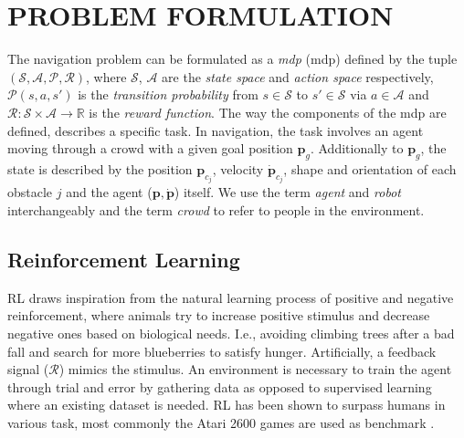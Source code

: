 \documentclass[letterpaper,conference,10pt]{IEEEconf}
\begin{document}
\section{PROBLEM FORMULATION}\label{sec:problem}

The navigation problem can be formulated as a \textit{\acrlong*{mdp}} (\acrshort*{mdp}) defined by the tuple $(\mathcal{S,A,P,R})$, where $\mathcal{S}$, $\mathcal{A}$ are the \textit{state space} and \textit{action space} respectively, $\mathcal{P}(s,a,s')$ is the \textit{transition probability} from $s\in\mathcal{S}$ to $s'\in\mathcal{S}$ via $a\in\mathcal{A}$ and $\mathcal{R}:\mathcal{S}\times\mathcal{A}\rightarrow \mathbb{R}$ is the \textit{reward function}. The way the components of the \acrshort*{mdp} are defined, describes a specific task. In navigation, the task involves an agent moving through a crowd with a given goal position $\boldsymbol{p}_g$. Additionally to $\boldsymbol{p}_g$, the state is described by the position $\boldsymbol{p}_{c_j}$, velocity $\dot{\boldsymbol{p}}_{c_j}$, shape and orientation of each obstacle $j$ and the agent ($\boldsymbol{p}, \dot{\boldsymbol{p}}$) itself. We use the term \textit{agent} and \textit{robot} interchangeably and the term \textit{crowd} to refer to people in the environment.

\subsection{Reinforcement Learning}

RL draws inspiration from the natural learning process of positive and negative reinforcement, where animals try to increase positive stimulus and decrease negative ones based on biological needs. I.e., avoiding climbing trees after a bad fall and search for more blueberries to satisfy hunger. Artificially, a feedback signal ($\mathcal{R}$) mimics the stimulus. An environment is necessary to train the agent through trial and error by gathering data as opposed to supervised learning where an existing dataset is needed. RL has been shown to surpass humans in various task, most commonly the Atari 2600 games are used as benchmark \cite{mnih_human-level_2015}.
\end{document}
